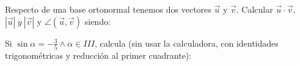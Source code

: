\documentclass[addpoints,spanish, 12pt,a4paper]{exam}
\begin{document}
        \begin{questions}
        \question Respecto de una base ortonormal tenemos dos vectores $\overrightarrow{u}$ y $\overrightarrow{v}$.
Calcular $\overrightarrow{u}\cdot\overrightarrow{v}$, $|\overrightarrow{u}| \ y \ |\overrightarrow{v}|$ 
y $\angle(\overrightarrow{u},\overrightarrow{v})$ siendo:
        \begin{multicols}{1} 
        \end{multicols}
        \question Si $\sin\alpha=-\frac{3}{5}\land \alpha \in III$, calcula (sin usar la calculadora, con identidades trigonométricas y reducción al primer cuadrante):
        \begin{multicols}{1} 
\end{multicols}
\end{questions}
\end{document}
